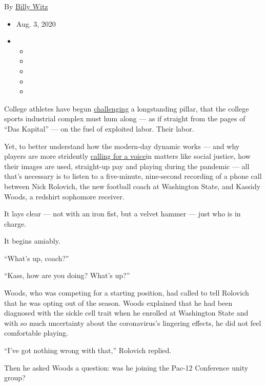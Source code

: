 By \href{https://www.nytimes3xbfgragh.onion/by/billy-witz}{Billy Witz}

\begin{itemize}
\item
  Aug. 3, 2020
\item
  \begin{itemize}
  \item
  \item
  \item
  \item
  \item
  \end{itemize}
\end{itemize}

College athletes have begun
\href{https://www.nytimes3xbfgragh.onion/2020/06/12/sports/ncaafootball/george-floyd-protests-college-sports.html}{challenging}
a longstanding pillar, that the college sports industrial complex must
hum along --- as if straight from the pages of ``Das Kapital'' --- on
the fuel of exploited labor. Their labor.

Yet, to better understand how the modern-day dynamic works --- and why
players are more stridently
\href{https://www.nytimes3xbfgragh.onion/2020/08/02/sports/ncaafootball/coronavirus-college-football-pac-12.html}{calling
for a voice}in matters like social justice, how their images are used,
straight-up pay and playing during the pandemic --- all that's necessary
is to listen to a five-minute, nine-second recording of a phone call
between Nick Rolovich, the new football coach at Washington State, and
Kassidy Woods, a redshirt sophomore receiver.

It lays clear --- not with an iron fist, but a velvet hammer --- just
who is in charge.

It begins amiably.

``What's up, coach?''

``Kass, how are you doing? What's up?''

Woods, who was competing for a starting position, had called to tell
Rolovich that he was opting out of the season. Woods explained that he
had been diagnosed with the sickle cell trait when he enrolled at
Washington State and with so much uncertainty about the coronavirus's
lingering effects, he did not feel comfortable playing.

``I've got nothing wrong with that,'' Rolovich replied.

Then he asked Woods a question: was he joining the Pac-12 Conference
unity group?

